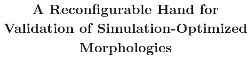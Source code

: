 \documentclass[journal]{IEEEtran}
\begin{document}

\title{A Reconfigurable Hand for Validation of Simulation-Optimized Morphologies}

\author{
   \\
}

\maketitle

\end{document}
